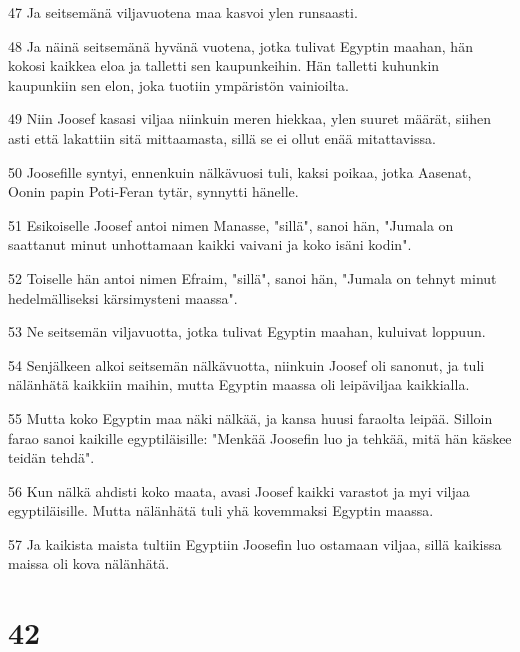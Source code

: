 \par 47 Ja seitsemänä viljavuotena maa kasvoi ylen runsaasti.
\par 48 Ja näinä seitsemänä hyvänä vuotena, jotka tulivat Egyptin maahan, hän kokosi kaikkea eloa ja talletti sen kaupunkeihin. Hän talletti kuhunkin kaupunkiin sen elon, joka tuotiin ympäristön vainioilta.
\par 49 Niin Joosef kasasi viljaa niinkuin meren hiekkaa, ylen suuret määrät, siihen asti että lakattiin sitä mittaamasta, sillä se ei ollut enää mitattavissa.
\par 50 Joosefille syntyi, ennenkuin nälkävuosi tuli, kaksi poikaa, jotka Aasenat, Oonin papin Poti-Feran tytär, synnytti hänelle.
\par 51 Esikoiselle Joosef antoi nimen Manasse, "sillä", sanoi hän, "Jumala on saattanut minut unhottamaan kaikki vaivani ja koko isäni kodin".
\par 52 Toiselle hän antoi nimen Efraim, "sillä", sanoi hän, "Jumala on tehnyt minut hedelmälliseksi kärsimysteni maassa".
\par 53 Ne seitsemän viljavuotta, jotka tulivat Egyptin maahan, kuluivat loppuun.
\par 54 Senjälkeen alkoi seitsemän nälkävuotta, niinkuin Joosef oli sanonut, ja tuli nälänhätä kaikkiin maihin, mutta Egyptin maassa oli leipäviljaa kaikkialla.
\par 55 Mutta koko Egyptin maa näki nälkää, ja kansa huusi faraolta leipää. Silloin farao sanoi kaikille egyptiläisille: "Menkää Joosefin luo ja tehkää, mitä hän käskee teidän tehdä".
\par 56 Kun nälkä ahdisti koko maata, avasi Joosef kaikki varastot ja myi viljaa egyptiläisille. Mutta nälänhätä tuli yhä kovemmaksi Egyptin maassa.
\par 57 Ja kaikista maista tultiin Egyptiin Joosefin luo ostamaan viljaa, sillä kaikissa maissa oli kova nälänhätä.

\chapter{42}

